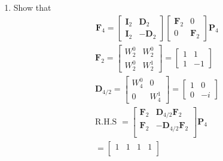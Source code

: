 \documentclass[journal,12pt,twocolumn]{IEEEtran}
\let\vec\mathbf
\renewcommand\thesection{\arabic{section}}
\begin{document}
\begin{enumerate}[label=\arabic*.,ref=\thesection.\theenumi]
	\item Show that 
	\begin{align}
		\vec{F}_{4}=
		\begin{bmatrix}
			\vec{I}_{2} & \vec{D}_{2} \\
			\vec{I}_{2} & -\vec{D}_{2}
		\end{bmatrix}
		\begin{bmatrix}
			\vec{F}_{2} & 0 \\
			0 & \vec{F}_{2}
		\end{bmatrix}
		\vec{P}_{4}
	\end{align}
	\solution
	\begin{align}
		\vec{F}_{2} = 
		\begin{bmatrix}
			W_{2}^0	&	W_{2}^0\\
			W_{2}^0	&	W_{2}^1
		\end{bmatrix}
		=		\begin{bmatrix}
			1	&	1\\
			1	&	-1
		\end{bmatrix}\\
		\vec{D}_{4/2} =
		\begin{bmatrix}
			W_4^0 &	0\\
			0	&	W_4^1 
		\end{bmatrix}
		=\begin{bmatrix}
			1	&	0\\
			0	&	-i 
		\end{bmatrix}\\
		\text{R.H.S } = 
		\begin{bmatrix}
			\vec{F}_{2} & \vec{D}_{4/2} \vec{F}_{2}\\
			\vec{F}_{2} & -\vec{D}_{4/2} \vec{F}_{2}\\
		\end{bmatrix}\vec{P}_{4}\\
		=\begin{bmatrix}
			1	&	1	&	1	&	1\\

\end{bmatrix}
\end{align}
\end{enumerate}
\end{document}

